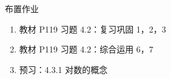 \documentclass[aspectratio=169,13pt,t] {beamer}
\theoremstyle{definition}
\begin{document}
\begin{frame}{布置作业}
	\begin{summarybox}[课后作业]
		\begin{enumerate}
			\item 教材 P119 习题 4.2：复习巩固 1，2，3
			\item 教材 P119 习题 4.2：综合运用 6，7
			\item 预习：4.3.1 对数的概念
		\end{enumerate}
	\end{summarybox}
\end{frame}
\end{document}

